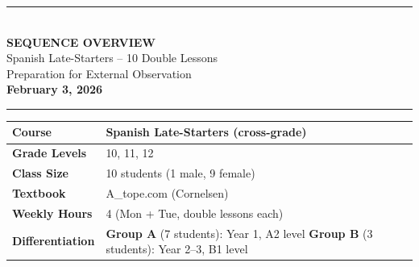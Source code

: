 \documentclass[11pt, a4paper]{article}
\begin{document}

\begin{center}
{\color{spanisch}\rule{\textwidth}{2pt}}\\[0.8cm]
{\Huge\bfseries SEQUENCE OVERVIEW}\\[0.3cm]
{\Large Spanish Late-Starters -- 10 Double Lessons}\\[0.5cm]
{\large Preparation for External Observation}\\[0.2cm]
{\large\bfseries February 3, 2026}\\[0.5cm]
{\color{spanisch}\rule{\textwidth}{2pt}}
\end{center}

\vspace{0.5cm}


\begin{center}
\begin{tabular}{|p{4cm}|p{11cm}|}
\hline
\rowcolor{hellgrau}
\textbf{Course} & Spanish Late-Starters (cross-grade) \\
\hline
\textbf{Grade Levels} & 10, 11, 12 \\
\hline
\textbf{Class Size} & 10 students (1 male, 9 female) \\
\hline
\textbf{Textbook} & A\_tope.com (Cornelsen) \\
\hline
\textbf{Weekly Hours} & 4 (Mon + Tue, double lessons each) \\
\hline
\rowcolor{hellgrau}
\textbf{Differentiation} & \textcolor{gruppeA}{\textbf{Group A}} (7 students): Year 1, A2 level \quad \textcolor{gruppeB}{\textbf{Group B}} (3 students): Year 2--3, B1 level \\
\hline
\end{tabular}
\end{center}

\vspace{0.5cm}

\end{document}
